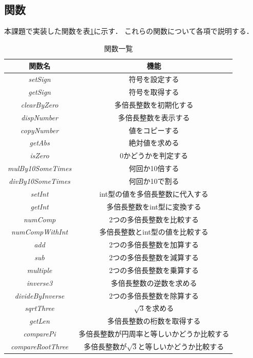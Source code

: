 \documentclass[a4paper,11pt,dvipdfmx]{jsarticle}
\begin{document}
\subsection{関数}
本課題で実装した関数を表\ref{table:function}に示す．
これらの関数について各項で説明する．
\begin{table}[H]
\centering
\caption{関数一覧}
\label{table:function}
\begin{tabular}{c|c}
\hline
関数名    & 機能   \\
\hline
\hline
\textit{setSign}    & 符号を設定する   \\
\hline
\textit{getSign}    & 符号を取得する   \\
\hline
\textit{clearByZero}    & 多倍長整数を初期化する   \\
\hline
\textit{dispNumber}   & 多倍長整数を表示する   \\
\hline
\textit{copyNumber}    & 値をコピーする   \\
\hline
\textit{getAbs}    & 絶対値を求める   \\
\hline
\textit{isZero}    & 0かどうかを判定する   \\
\hline
\textit{mulBy10SomeTimes}    & 何回か10倍する   \\
\hline
\textit{divBy10SomeTimes}    & 何回か10で割る   \\
\hline
\textit{setInt}    & int型の値を多倍長整数に代入する   \\
\hline
\textit{getInt}    & 多倍長整数をint型に変換する   \\
\hline
\textit{numComp}    & 2つの多倍長整数を比較する   \\
\hline
\textit{numCompWithInt}    & 多倍長整数とint型の値を比較する   \\
\hline
\textit{add}    & 2つの多倍長整数を加算する   \\
\hline
\textit{sub}    & 2つの多倍長整数を減算する   \\
\hline
\textit{multiple}    & 2つの多倍長整数を乗算する   \\
\hline
\textit{inverse3}    & 多倍長整数の逆数を求める   \\
\hline
\textit{divideByInverse}   & 2つの多倍長整数を除算する   \\
\hline
\textit{sqrtThree}    & $\sqrt{3}$を求める   \\
\hline
\textit{getLen}    & 多倍長整数の桁数を取得する   \\
\hline
\textit{comparePi}    & 多倍長整数が円周率と等しいかどうか比較する   \\
\hline
\textit{compareRootThree}    & 多倍長整数が$\sqrt{3}$と等しいかどうか比較する   \\
\hline
\end{tabular}
\end{table}
\end{document}
